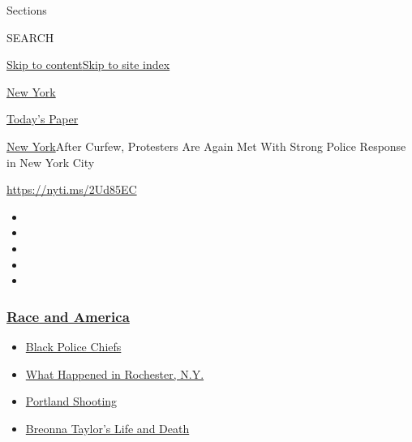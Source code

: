 Sections

SEARCH

\protect\hyperlink{site-content}{Skip to
content}\protect\hyperlink{site-index}{Skip to site index}

\href{https://www.nytimes3xbfgragh.onion/section/nyregion}{New York}

\href{https://myaccount.nytimes3xbfgragh.onion/auth/login?response_type=cookie\&client_id=vi}{}

\href{https://www.nytimes3xbfgragh.onion/section/todayspaper}{Today's
Paper}

\href{/section/nyregion}{New York}\textbar{}After Curfew, Protesters Are
Again Met With Strong Police Response in New York City

\url{https://nyti.ms/2Ud85EC}

\begin{itemize}
\item
\item
\item
\item
\item
\end{itemize}

\hypertarget{race-and-america}{%
\subsubsection{\texorpdfstring{\href{https://www.nytimes3xbfgragh.onion/news-event/george-floyd-protests-minneapolis-new-york-los-angeles?name=styln-george-floyd\&region=TOP_BANNER\&block=storyline_menu_recirc\&action=click\&pgtype=Article\&impression_id=7ed72ce0-f4cf-11ea-9a82-8ff3d0b97313\&variant=undefined}{Race
and America}}{Race and America}}\label{race-and-america}}

\begin{itemize}
\tightlist
\item
  \href{https://www.nytimes3xbfgragh.onion/2020/09/11/us/black-police-chiefs-reform.html?name=styln-george-floyd\&region=TOP_BANNER\&block=storyline_menu_recirc\&action=click\&pgtype=Article\&impression_id=7ed753f0-f4cf-11ea-9a82-8ff3d0b97313\&variant=undefined}{Black
  Police Chiefs}
\item
  \href{https://www.nytimes3xbfgragh.onion/2020/09/04/nyregion/rochester-police-daniel-prude.html?name=styln-george-floyd\&region=TOP_BANNER\&block=storyline_menu_recirc\&action=click\&pgtype=Article\&impression_id=7ed753f1-f4cf-11ea-9a82-8ff3d0b97313\&variant=undefined}{What
  Happened in Rochester, N.Y.}
\item
  \href{https://www.nytimes3xbfgragh.onion/2020/08/30/us/portland-shooting-explained.html?name=styln-george-floyd\&region=TOP_BANNER\&block=storyline_menu_recirc\&action=click\&pgtype=Article\&impression_id=7ed753f2-f4cf-11ea-9a82-8ff3d0b97313\&variant=undefined}{Portland
  Shooting}
\item
  \href{https://www.nytimes3xbfgragh.onion/2020/08/30/us/breonna-taylor-police-killing.html?name=styln-george-floyd\&region=TOP_BANNER\&block=storyline_menu_recirc\&action=click\&pgtype=Article\&impression_id=7ed753f3-f4cf-11ea-9a82-8ff3d0b97313\&variant=undefined}{Breonna
  Taylor's Life and Death}
\end{itemize}

